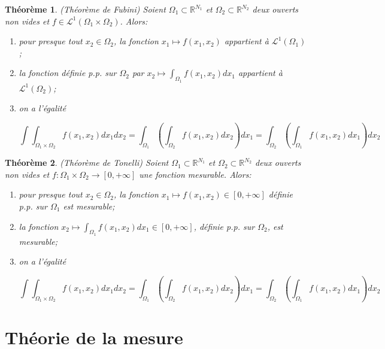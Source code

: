 \documentclass[10pt,a4paper,oneside]{article}
\newtheorem{theoreme}{Théorème}
\begin{document}
\begin{theoreme}
(Théorème de Fubini)
Soient $\Omega_1 \subset \mathbb{R}^{N_1}$ et $\Omega_2 \subset \mathbb{R}^{N_2}$ deux ouverts non vides et $f \in \mathcal{L}^1(\Omega_1 \times \Omega_2)$. Alors:

\begin{enumerate}
\item
pour presque tout $x_2 \in \Omega_2$, la fonction $x_1 \mapsto f(x_1,x_2)$ appartient à $\mathcal{L}^1(\Omega_1)$;

\item
la fonction définie p.p. sur $\Omega_2$ par $x_2 \mapsto \int_{\Omega_1} f(x_1,x_2) dx_1$ appartient à $\mathcal{L}^1(\Omega_2)$;

\item
on a l'égalité

\[ \int \int_{\Omega_1 \times \Omega_2} f(x_1,x_2) dx_1 dx_2 = \int_{\Omega_1} \left(  \int_{\Omega_2} f(x_1,x_2) dx_2 \right) dx_1 = \int_{\Omega_2} \left( \int_{\Omega_1} f(x_1,x_2) dx_1 \right) dx_2 \]
\end{enumerate}
\end{theoreme}

\begin{theoreme}
(Théorème de Tonelli)
Soient $\Omega_1 \subset \mathbb{R}^{N_1}$ et $\Omega_2 \subset \mathbb{R}^{N_2}$ deux ouverts non vides et $f : \Omega_1 \times \Omega_2 \to [0,+\infty]$ une fonction mesurable. Alors:

\begin{enumerate}
\item
pour presque tout $x_2 \in \Omega_2$, la fonction $x_1 \mapsto f(x_1,x_2) \in [0,+\infty]$ définie p.p. sur $\Omega_1$ est mesurable;

\item
la fonction $x_2 \mapsto \int_{\Omega_1} f(x_1,x_2)dx_1 \in [0,+\infty]$, définie p.p. sur $\Omega_2$, est mesurable;

\item
on a l'égalité

\[ \int \int_{\Omega_1 \times \Omega_2} f(x_1,x_2) dx_1 dx_2 = \int_{\Omega_1} \left(  \int_{\Omega_2} f(x_1,x_2) dx_2 \right) dx_1 = \int_{\Omega_2} \left( \int_{\Omega_1} f(x_1,x_2) dx_1 \right) dx_2 \]
\end{enumerate}
\end{theoreme}

\section{Théorie de la mesure}
\end{document}
